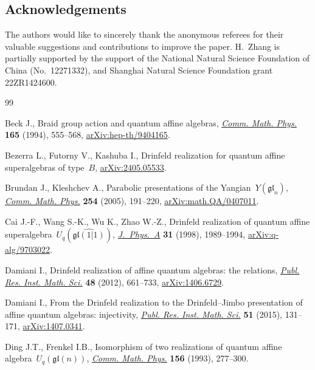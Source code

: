\documentclass[pdftex]{sigma}
\numberwithin{equation}{section}
\begin{document}
\subsection*{Acknowledgements}

The authors would like to sincerely thank the anonymous referees for their valuable suggestions and contributions to improve the paper.
H.~Zhang is partially supported by the support of the National Natural Science Foundation of China (No.~12271332), and Shanghai Natural Science Foundation grant 22ZR1424600.

\begin{thebibliography}{99}
\footnotesize\itemsep=0pt

Beck J., Braid group action and quantum affine algebras, \href{https://doi.org/10.1007/BF02099423}{\textit{Comm. Math.
 Phys.}} \textbf{165} (1994), 555--568, \href{https://arxiv.org/abs/hep-th/9404165}{arXiv:hep-th/9404165}.

Bezerra L., Futorny V., Kashuba I., Drinfeld realization for quantum affine
 superalgebras of type~{$B$}, \href{https://arxiv.org/abs/2405.05533}{arXiv:2405.05533}.

Brundan J., Kleshchev A., Parabolic presentations of the
 {Y}angian~{$Y({\mathfrak{gl}}_n)$}, \href{https://doi.org/10.1007/s00220-004-1249-6}{\textit{Comm. Math. Phys.}} \textbf{254}
 (2005), 191--220, \href{https://arxiv.org/abs/math.QA/0407011}{arXiv:math.QA/0407011}.

Cai J.-F., Wang S.-K., Wu K., Zhao W.-Z., Drinfeld realization of quantum affine
 superalgebra~{$U_q(\widehat{\mathfrak{gl}(1|1)})$}, \href{https://doi.org/10.1088/0305-4470/31/8/011}{\textit{J.~Phys.~A}}
 \textbf{31} (1998), 1989--1994, \href{https://arxiv.org/abs/q-alg/9703022}{arXiv:q-alg/9703022}.

Damiani I., Drinfeld realization of affine quantum algebras: the relations,
\href{https://doi.org/10.2977/PRIMS/86}{\textit{Publ. Res. Inst. Math. Sci.}} \textbf{48} (2012), 661--733,
 \href{https://arxiv.org/abs/1406.6729}{arXiv:1406.6729}.

Damiani I., From the {D}rinfeld realization to the {D}rinfeld--{J}imbo
 presentation of affine quantum algebras: injectivity, \href{https://doi.org/10.4171/PRIMS/150}{\textit{Publ. Res.
 Inst. Math. Sci.}} \textbf{51} (2015), 131--171, \href{https://arxiv.org/abs/1407.0341}{arXiv:1407.0341}.

Ding J.T., Frenkel I.B., Isomorphism of two realizations of quantum affine
 algebra~{$U_q(\mathfrak{gl}(n))$}, \href{https://doi.org/10.1007/bf02098484}{\textit{Comm. Math. Phys.}} \textbf{156}
 (1993), 277--300.


\end{thebibliography}
\end{document}
